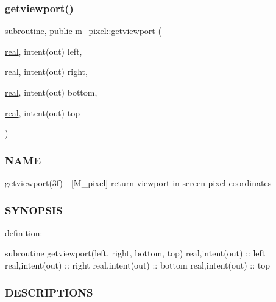 \mbox{\label{namespacem__pixel_a9f382cf8d3b69e11d1fdd2f2a4f59dea}} 
\subsubsection{\texorpdfstring{getviewport()}{getviewport()}}
{\footnotesize\ttfamily \hyperlink{M__stopwatch_83_8txt_acfbcff50169d691ff02d4a123ed70482}{subroutine}, \hyperlink{M__stopwatch_83_8txt_a2f74811300c361e53b430611a7d1769f}{public} m\+\_\+pixel\+::getviewport (\begin{DoxyParamCaption}\item[{\hyperlink{read__watch_83_8txt_abdb62bde002f38ef75f810d3a905a823}{real}, intent(out)}]{left,  }\item[{\hyperlink{read__watch_83_8txt_abdb62bde002f38ef75f810d3a905a823}{real}, intent(out)}]{right,  }\item[{\hyperlink{read__watch_83_8txt_abdb62bde002f38ef75f810d3a905a823}{real}, intent(out)}]{bottom,  }\item[{\hyperlink{read__watch_83_8txt_abdb62bde002f38ef75f810d3a905a823}{real}, intent(out)}]{top }\end{DoxyParamCaption})}



\subsubsection*{N\+A\+ME}

getviewport(3f) -\/ \mbox{[}M\+\_\+pixel\mbox{]} return viewport in screen pixel coordinates 

\subsubsection*{S\+Y\+N\+O\+P\+S\+IS}

definition\+:

subroutine getviewport(left, right, bottom, top) real,intent(out) \+:\+: left real,intent(out) \+:\+: right real,intent(out) \+:\+: bottom real,intent(out) \+:\+: top

\subsubsection*{D\+E\+S\+C\+R\+I\+P\+T\+I\+O\+NS}

